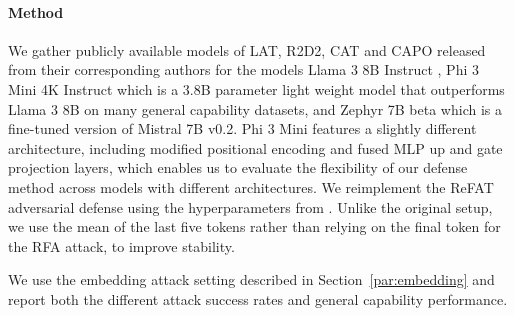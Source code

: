 \documentclass[11pt]{article}
\begin{document}
\paragraph{Method}
We gather publicly available models of LAT, R2D2, CAT and CAPO released from their corresponding authors
for the models Llama 3 8B Instruct \citep{grattafiori2024llama3herdmodels}, Phi 3 Mini 4K Instruct \citep{abdin2024phi3technicalreporthighly} which is a 3.8B parameter light weight model that outperforms Llama 3 8B on many general capability datasets, and Zephyr 7B beta \citep{tunstall2023zephyr} which is a fine-tuned version of Mistral 7B v0.2. Phi 3 Mini features a slightly different architecture, including modified positional encoding and fused MLP up and gate projection layers, which enables us to evaluate the flexibility of our defense method across models with different architectures.
We reimplement the ReFAT adversarial defense using the hyperparameters from \citet{yu2025robustllmsafeguardingrefusal}.
Unlike the original setup, we use the mean of the last five tokens rather than relying on the final token for the RFA attack, to improve stability.

We use the embedding attack setting described in Section~\ref{par:embedding} and report both the different attack success rates and general capability performance.

\begin{table}[tb]
\centering
{}
\caption{General performance of defenses on Phi 3 Mini and Zephyr 7B}
\label{tab:general_all}
\end{table}
\end{document}

